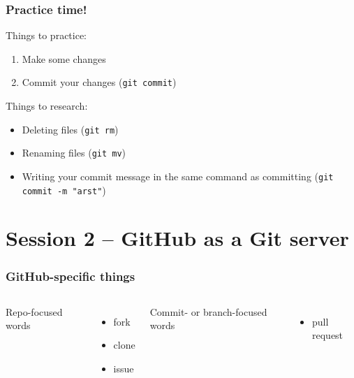 \documentclass[14pt,aspectratio=1610]{beamer} %
\newcommand{\fframe}[2]{
   \begin{frame}
\frametitle{#1}
#2
\end{frame}
}
\begin{document}
\fframe{Practice time!}
{
Things to practice:
	\begin{enumerate}
		\item Make some changes
		\item Commit your changes ({\tt git commit})
	\end{enumerate}

	Things to research:
	\begin{itemize}
		\item Deleting files ({\tt git rm})
		\item Renaming files ({\tt git mv})
		\item Writing your commit message in the same command as committing ({\tt git commit -m "arst"})
	\end{itemize}
}




























\section{Session 2 -- GitHub as a Git server}

\fframe{GitHub-specific things}
{
		\begin{columns}[t]
	\column{2in}
	Repo-focused words
	\begin{itemize}
		\item fork
		\item clone
		\item issue


		
	\end{itemize}

	\column{2in}
	Commit- or branch-focused words
	\begin{itemize}		
		\item pull request
	\end{itemize}
	\end{columns}
}
\end{document}
